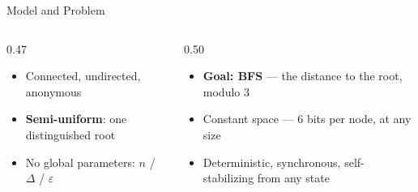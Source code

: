 \documentclass[aspectratio=169,11pt]{beamer}
\newcommand{\bodyfont}{\footnotesize}
\begin{document}
\begin{frame}{Model and Problem}
\vspace{1mm}
{\bodyfont
\begin{columns}[T]
\begin{column}{0.47\textwidth}
\begin{itemize}\setlength\itemsep{2pt}
\item Connected, undirected, anonymous
\item \textbf{Semi-uniform}: one distinguished root
\item No global parameters: $n$ / $\Delta$ / $\varepsilon$
\end{itemize}
\end{column}
\begin{column}{0.50\textwidth}
\begin{itemize}\setlength\itemsep{2pt}
\item \textbf{Goal: BFS} --- the distance to the root, modulo 3
\item Constant space --- 6 bits per node, at any size
\item Deterministic, synchronous, self-stabilizing from any state
\end{itemize}
\end{column}
\end{columns}}
\end{frame}
\end{document}
